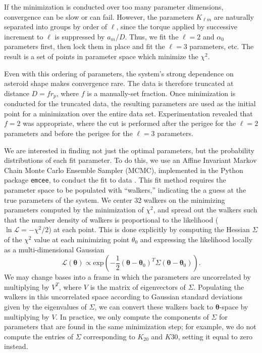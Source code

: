 \documentclass[linenumbers]{aastex631}
\newcommand{\parens}[1]{\left( #1 \right)}
\begin{document}
If the minimization is conducted over too many parameter dimensions, convergence can be slow or can fail. However, the parameters $K_{\ell m}$ are naturally separated into groups by order of $\ell$, since the torque applied by successive increment to $\ell$ is suppressed by $a_m/D$. Thus, we fit the $\ell=2$ and $\alpha_0$ parameters first, then lock them in place and fit the $\ell=3$ parameters, etc. The result is a set of points in parameter space which minimize the $\chi^2$.

Even with this ordering of parameters, the system's strong dependence on asteroid shape makes convergence rare. The data is therefore truncated at distance $D = f r_p$, where $f$ is a manually-set fraction. Once minimization is conducted for the truncated data, the resulting parameters are used as the initial point for a minimization over the entire data set. Experimentation revealed that $f=2$ was appropriate, where the cut is performed after the perigee for the $\ell = 2$ parameters and before the perigee for the $\ell = 3$ parameters.

We are interested in finding not just the optimal parameters, but the probability distributions of each fit parameter. To do this, we use an Affine Invariant Markov Chain Monte Carlo Ensemble Sampler (MCMC), implemented in the Python package \texttt{emcee}, to conduct the fit to data \cite{ForemanMackey2013emceeTM}. This fit method requires the parameter space to be populated with ``walkers,'' indicating the a guess at the true parameters of the system. We center 32 walkers on the minimizing parameters computed by the minimization of $\chi^2$, and spread out the walkers such that the number density of walkers is proportional to the likelihood ($\ln \mathcal{L} = -\chi^2/2$) at each point. This is done explicitly by computing the Hessian $\Sigma$ of the $\chi^2$ value at each minimizing point $\theta_0$ and expressing the likelihood locally as a multi-dimensional Gaussian
\begin{equation}
\mathcal{L}(\mathbf \theta) \propto \text{exp}\parens{-\frac{1}{2}(\mathbf \theta-\mathbf \theta_0)^T \Sigma (\mathbf \theta-\mathbf \theta_0)}.
\end{equation}
We may change bases into a frame in which the parameters are uncorrelated by multiplying by $V^T$, where $V$ is the matrix of eigenvectors of $\Sigma$. Populating the walkers in this uncorrelated space according to Gaussian standard deviations given by the eigenvalues of $\Sigma$, we can convert these walkers back to $\mathbf \theta$-space by multiplying by $V$. In practice, we only compute the components of $\Sigma$ for parameters that are found in the same minimization step; for example, we do not compute the entries of $\Sigma$ corresponding to $K_{20}$ and $K{30}$, setting it equal to zero instead.
\end{document}
